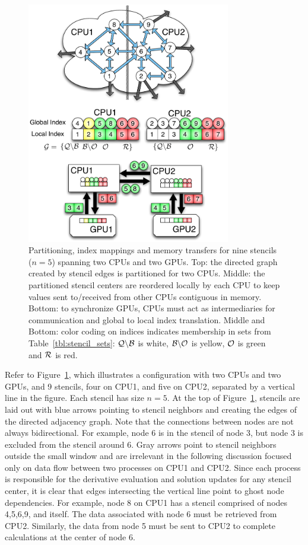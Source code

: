 \documentclass{report}
\begin{document}
                \begin{figure}[ht] 
            \centering
            \includegraphics[width=3.5in]{../figures/paper1/figures/omnigraffle/SimpleExample.pdf} 
            \caption{Partitioning, index mappings and memory transfers for nine stencils ($n=5$) spanning two CPUs and two GPUs. Top: the directed graph created by stencil edges is partitioned for two CPUs. Middle: the partitioned stencil centers are reordered locally by each CPU to keep values sent to/received from other CPUs contiguous in memory. Bottom: to synchronize GPUs, CPUs must act as intermediaries for communication and global to local index translation. Middle and Bottom: color coding on indices indicates membership in sets from Table~\ref{tbl:stencil_sets}: $\mathcal{Q} \backslash \mathcal{B}$ is white, $\mathcal{B} \backslash \mathcal{O}$ is yellow, $\mathcal{O}$ is green and $\mathcal{R}$ is red.
            }
            \label{fig:stencilSets2CPU}
        \end{figure}	

Refer to Figure~\ref{fig:stencilSets2CPU}, which illustrates a configuration with two 
CPUs and two GPUs, and 9 stencils, four on CPU1, and five on CPU2, separated
by a vertical line in the figure. Each stencil
has size $n=5$. At the top of Figure~\ref{fig:stencilSets2CPU}, stencils are laid out
with blue arrows pointing to stencil neighbors and creating the edges of the directed adjacency graph. Note that the connections between nodes are not 
always bidirectional. For example, node 6 is in the stencil of node 3, but 
node 3 is excluded from the stencil around 6. 
Gray arrows point to stencil neighbors outside the small window and are irrelevant in the following discussion focused only on data flow between two processes on CPU1 and CPU2. 
Since each process is responsible for the derivative evaluation and solution updates for any stencil center, it is clear that edges intersecting the vertical line point to ghost node dependencies. For example, node 8 on CPU1 has a stencil comprised of
nodes 4,5,6,9, and itself. The data associated with node 6 must be retrieved
from CPU2. Similarly, the data from node 5 must be sent to CPU2 to 
complete calculations at the center of node 6.
        
\end{document}
